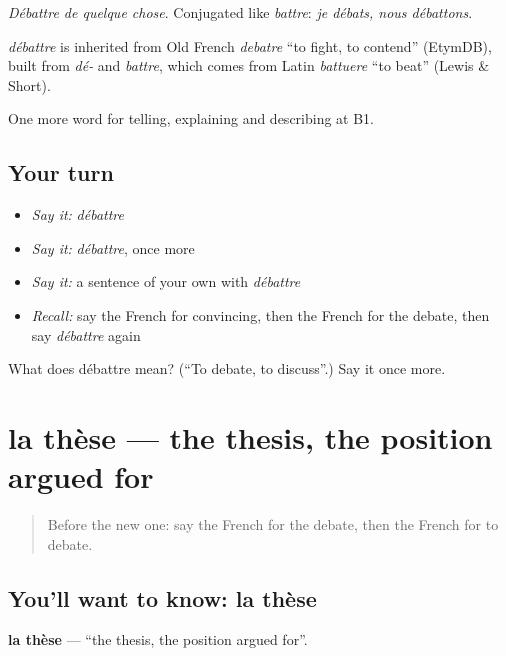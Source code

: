 \emph{Débattre de quelque chose}. Conjugated like \emph{battre}: \emph{je débats, nous débattons}.

\begin{cousinweb}
\emph{débattre} is inherited from Old French \emph{debatre} \textquotedblleft{}to fight, to contend\textquotedblright{} (EtymDB), built from \emph{dé-} and \emph{battre}, which comes from Latin \emph{battuere} \textquotedblleft{}to beat\textquotedblright{} (Lewis \& Short).
\end{cousinweb}

\begin{grammarlens}[title={What you've built}]
One more word for telling, explaining and describing at B1.
\end{grammarlens}

\subsection*{Your turn}
\begin{itemize}
\raggedright
  \item \emph{Say it:} \emph{débattre}
  \item \emph{Say it:} \emph{débattre}, once more
  \item \emph{Say it:} a sentence of your own with \emph{débattre}
  \item \emph{Recall:} say the French for convincing, then the French for the debate, then say \emph{débattre} again
\end{itemize}

\begin{tcolorbox}[breakable,colback=teal!4,colframe=teal!35!black,title={Before you move on}]
What does débattre mean? (\textquotedblleft{}To debate, to discuss\textquotedblright{}.) Say it once more.
\end{tcolorbox}
\section[la thèse]{la thèse — the thesis, the position argued for}

\label{lesson:FR-C335-these}



\begin{quote}
Before the new one: say the French for the debate, then the French for to debate.
\end{quote}

\subsection*{You'll want to know: la thèse}
\textbf{la thèse} — \textquotedblleft{}the thesis, the position argued for\textquotedblright{}.

